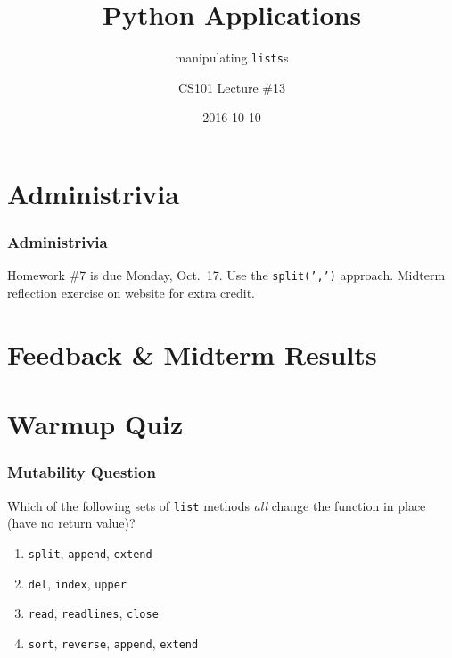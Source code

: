 \documentclass[11pt]{beamer}
\title{Python Applications}
\subtitle{manipulating \texttt{lists}s}
\author{CS101 Lecture \#13}
\date{2016-10-10}
\begin{document}
  \setcounter{showProgressBar}{0}
  \setcounter{showSlideNumbers}{0}

\frame{\titlepage}

\setcounter{framenumber}{0}
\setcounter{showProgressBar}{1}
\setcounter{showSlideNumbers}{1}

\section{Administrivia}

\begin{frame}
  \frametitle{Administrivia}
  \Enlarge

  \begin{itemize}
  \myitem  Homework \#7 is due Monday, Oct.\ 17.
  \mysubitem  Use the \texttt{split(',')} approach.
  \myitem  Midterm reflection exercise on website for extra credit.
  \end{itemize}
\end{frame}

\section{Feedback \& Midterm Results}

\section{Warmup Quiz}

\begin{frame}[fragile]
  \frametitle{Mutability Question}
  \Enlarge

  Which of the following sets of \texttt{list} methods \emph{all} change the function in place (have no return value)?

  \begin{enumerate}[label=\Alph*]
  \item  \texttt{split}, \texttt{append}, \texttt{extend}
  \item  \texttt{del}, \texttt{index}, \texttt{upper}
  \item  \texttt{read}, \texttt{readlines}, \texttt{close}
  \item  \texttt{sort}, \texttt{reverse}, \texttt{append}, \texttt{extend}
  \end{enumerate}
\end{frame}
\end{document}
